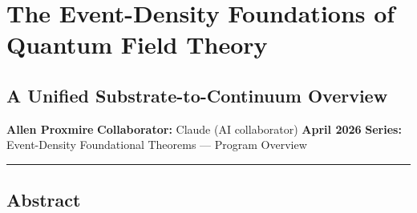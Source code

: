 \documentclass[
]{article}
\author{}
\date{}
\begin{document}
\section{The Event-Density Foundations of Quantum Field
Theory}\label{the-event-density-foundations-of-quantum-field-theory}

\subsection{A Unified Substrate-to-Continuum
Overview}\label{a-unified-substrate-to-continuum-overview}

\textbf{Allen Proxmire} \textbf{Collaborator:} Claude (AI collaborator)
\textbf{April 2026} \textbf{Series:} Event-Density Foundational Theorems
--- Program Overview

\begin{center}\rule{0.5\linewidth}{0.5pt}\end{center}

\subsection{Abstract}\label{abstract}
\end{document}
